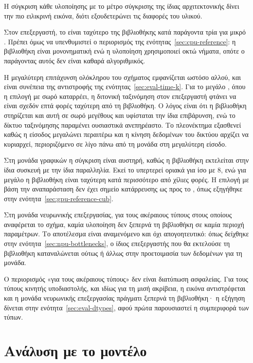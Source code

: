 Η σύγκριση κάθε υλοποίησης με το μέτρο σύγκρισης της ίδιας αρχιτεκτονικής δίνει
την πιο ειλικρινή εικόνα, διότι εξουδετερώνει τις διαφορές του υλικού.

Στον επεξεργαστή, το  είναι ταχύτερο της βιβλιοθήκης κατά
παράγοντα τρία για μικρό . Πρέπει όμως να υπενθυμιστεί ο περιορισμός της
ενότητας~\ref{sec:cpu-reference}: η βιβλιοθήκη είναι μονονηματική ενώ η
υλοποίηση χρησιμοποιεί οκτώ νήματα, οπότε ο παράγοντας αυτός δεν είναι καθαρά
αλγοριθμικός.

Η μεγαλύτερη επιτάχυνση ολόκληρου του σχήματος εμφανίζεται ωστόσο αλλού, και
είναι συνέπεια της αντιστροφής της ενότητας~\ref{sec:eval-time-k}. Για το
μεγάλο , όπου η επιλογή με σωρό καταρρέει, η διτονική ταξινόμηση στον
επεξεργαστή φτάνει να είναι σχεδόν επτά φορές ταχύτερη από τη βιβλιοθήκη. Ο
λόγος είναι ότι η βιβλιοθήκη στηρίζεται και αυτή σε σωρό μεγέθους  και
υφίσταται την ίδια επιβάρυνση, ενώ το δίκτυο ταξινόμησης παραμένει ουσιαστικά
ανεπηρέαστο. Το πλεονέκτημα εξασθενεί καθώς η είσοδος μεγαλώνει περαιτέρω και η
κίνηση δεδομένων του δικτύου αρχίζει να κυριαρχεί, περιοριζόμενο σε λίγο πάνω
από τη μονάδα στη μεγαλύτερη είσοδο.

Στη μονάδα γραφικών η σύγκριση είναι αυστηρή, καθώς η βιβλιοθήκη εκτελείται στην
ίδια συσκευή με την ίδια παραλληλία. Εκεί το  υπερτερεί οριακά
για  ίσο με 8, ενώ για μεγάλο  η βιβλιοθήκη είναι ταχύτερη κατά
περισσότερο από χίλιες φορές. Η επιλογή με βάση την αναπαράσταση δεν έχει σημείο
κατάρρευσης ως προς το , όπως εξηγήθηκε στην
ενότητα~\ref{sec:gpu-reference-cub}.

Στη μονάδα νευρωνικής επεξεργασίας, για τους ακέραιους τύπους στους οποίους
αναφέρεται το σχήμα, καμία υλοποίηση δεν ξεπερνά τη βιβλιοθήκη σε καμία περιοχή
παραμέτρων. Το αποτέλεσμα είναι αναμενόμενο και όχι απογοητευτικό: όπως δείχθηκε
στην ενότητα~\ref{sec:npu-bottlenecks}, ο ίδιος επεξεργαστής που θα εκτελούσε τη
βιβλιοθήκη καταναλώνεται ούτως ή άλλως στην προετοιμασία των δεδομένων για τη
μονάδα.

Ο περιορισμός «για τους ακέραιους τύπους» δεν είναι διατύπωση ασφαλείας. Για
τους τύπους κινητής υποδιαστολής, και ιδίως για τη μισή ακρίβεια, η εικόνα
αντιστρέφεται και η μονάδα νευρωνικής επεξεργασίας πράγματι ξεπερνά τη
βιβλιοθήκη· η εξήγηση δίνεται στην ενότητα~\ref{sec:eval-dtypes}, αφού πρώτα
παρουσιαστεί η συμπεριφορά των τύπων.

\section{Ανάλυση με το μοντέλο }
\label{sec:eval-roofline}

